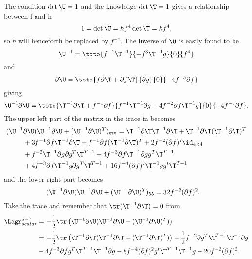 The condition $\det\U=1$ and the knowledge $\det\T=1$ gives a relationship between f and h
\begin{equation}
1=\det\U=hf^4\det\T=hf^4,
\end{equation}
so $h$ will henceforth be replaced by $f^{-4}$.
The inverse of $\U$ is easily found to be
\begin{equation}
\U^{-1}=\toto{f^{-1}\T^{-1}}{-f^{3}\T^{-1}g}{0}{f^4}
\end{equation}
and
\begin{equation}
\partial\U=\toto{f\partial\T+\partial f\T}{\partial g}{0}{-4f^{-5}\partial f}
\end{equation}
giving
\begin{equation}
\U^{-1}\partial\U = \toto{\T^{-1}\partial\T+f^{-1}\partial f}{f^{-1}\T^{-1}\partial g+4f^{-2}\partial f\T^{-1}g}{0}{-4f^{-1}\partial f}. 
\end{equation}
The upper left part of the matrix in the trace in  becomes
\begin{align}
(\U^{-1}&\partial\U(\U^{-1}\partial\U+(\U^{-1}\partial\U)^T)_{mn}=\T^{-1}\partial\T\T^{-1}\partial\T+\T^{-1}\partial\T(\T^{-1}\partial%
\T)^T\nonumber\\
&+3f^{-1}\partial f \T^{-1}\partial\T+f^{-1}\partial f (\T^{-1}\partial\T)^T+2f^{-2}(\partial f)^2\id_{4\times4}\nonumber\\
&+f^{-2}\T^{-1}\partial g\partial g^T\T^{T-1}+4f^{-3}\partial f\T^{-1}\partial g g^T\T^{T-1}\nonumber\\
&+4f^{-3}\partial f\T^{-1}g\partial g^T\T^{T-1}+16f^{-4}(\partial f)^2\T^{-1}gg^t\T^{T-1}
\end{align}
and the lower right part becomes
\begin{align}
(\U^{-1}&\partial\U(\U^{-1}\partial\U+(\U^{-1}\partial\U)^T)_{55}=32f^{-2}(\partial f)^2.
\end{align}
Take the trace and remember that $\tr(\T^{-1}\partial\T)=0$ from 
\begin{align}
\Lagr_{scalar}^{d=7} &=-\frac{1}{2}\tr\left(\U^{-1}\partial\U(\U^{-1}\partial\U+(\U^{-1}\partial\U)^T)\right)\\
&=-\frac{1}{2}\tr\left(\T^{-1}\partial\T(\T^{-1}\partial\T+(\T^{-1}\partial\T)^T)\right)-\frac{1}{2}f^{-2}\partial g^T\T^{T-1}\T^{-1}\partial g\nonumber\\
&-4f^{-3}\partial fg^T\T^{T-1}\T^{-1}\partial g
-8f^{-4}(\partial f)^2g^t\T^{T-1}\T^{-1}g-20f^{-2}(\partial f)^2.\nonumber
\end{align}
